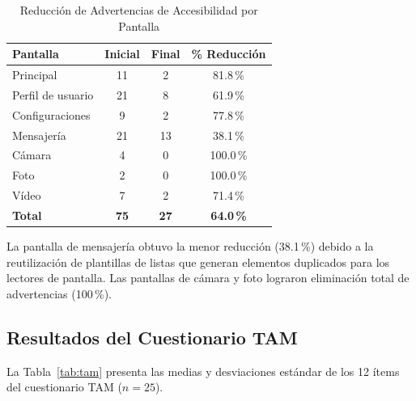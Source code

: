 \documentclass[journal]{IEEEtran}
\begin{document}
\begin{table}[!t]
\caption{Reducci\'on de Advertencias de Accesibilidad por Pantalla}
\label{tab:accesibilidad}
\centering
\small
\renewcommand{\arraystretch}{1.2}
\begin{tabular}{lccc}
\toprule
\textbf{Pantalla}      & \textbf{Inicial} & \textbf{Final} & \textbf{\% Reducci\'on} \\
\midrule
Principal              & 11 & 2  & 81.8\,\% \\
Perfil de usuario      & 21 & 8  & 61.9\,\% \\
Configuraciones        & 9  & 2  & 77.8\,\% \\
Mensajer\'ia           & 21 & 13 & 38.1\,\% \\
C\'amara               & 4  & 0  & 100.0\,\% \\
Foto                   & 2  & 0  & 100.0\,\% \\
V\'ideo                & 7  & 2  & 71.4\,\% \\
\midrule
\textbf{Total}         & \textbf{75} & \textbf{27} & \textbf{64.0\,\%} \\
\bottomrule
\end{tabular}
\end{table}

La pantalla de mensajer\'ia obtuvo la menor reducci\'on (38.1\,\%) debido a la reutilizaci\'on de plantillas de listas que generan elementos duplicados para los lectores de pantalla. Las pantallas de c\'amara y foto lograron eliminaci\'on total de advertencias (100\,\%).

\subsection{Resultados del Cuestionario TAM}

La Tabla~\ref{tab:tam} presenta las medias y desviaciones est\'andar de los 12 \'items del cuestionario TAM ($n = 25$).
\end{document}
